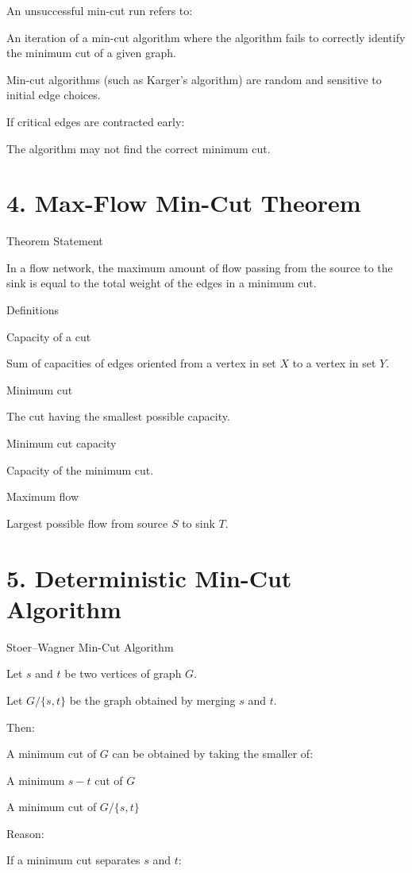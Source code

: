 \documentclass[12pt]{article}
\begin{document}
An unsuccessful min-cut run refers to:

An iteration of a min-cut algorithm where the algorithm fails to correctly identify the minimum cut of a given graph.

Min-cut algorithms (such as Karger’s algorithm) are random and sensitive to initial edge choices.

If critical edges are contracted early:

The algorithm may not find the correct minimum cut.

\section*{4. Max-Flow Min-Cut Theorem}

Theorem Statement

In a flow network, the maximum amount of flow passing from the source to the sink is equal to the total weight of the edges in a minimum cut.

Definitions

Capacity of a cut

Sum of capacities of edges oriented from a vertex in set \( X \) to a vertex in set \( Y \).

Minimum cut

The cut having the smallest possible capacity.

Minimum cut capacity

Capacity of the minimum cut.

Maximum flow

Largest possible flow from source \( S \) to sink \( T \).

\section*{5. Deterministic Min-Cut Algorithm}

Stoer–Wagner Min-Cut Algorithm

Let \( s \) and \( t \) be two vertices of graph \( G \).

Let \( G/\{s,t\} \) be the graph obtained by merging \( s \) and \( t \).

Then:

A minimum cut of \( G \) can be obtained by taking the smaller of:

A minimum \( s - t \) cut of \( G \)

A minimum cut of \( G/\{s,t\} \)

Reason:

If a minimum cut separates \( s \) and \( t \):
\end{document}
